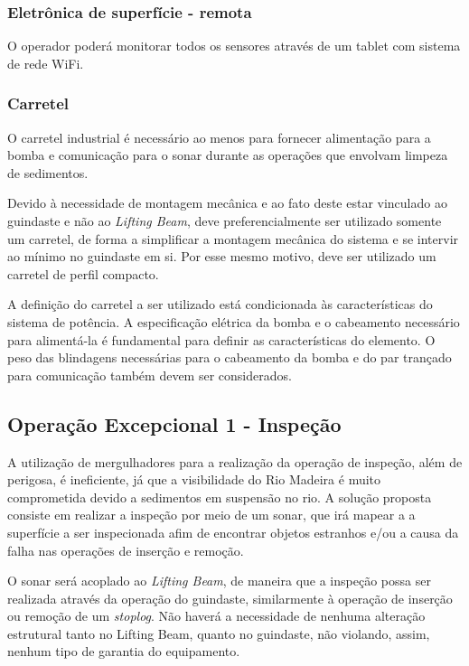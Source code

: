\subsubsection{Eletrônica de superfície - remota}
O operador poderá monitorar todos os sensores através de um tablet com sistema
de rede WiFi.

\subsubsection{Carretel}
O carretel industrial é necessário ao menos para fornecer alimentação para a
bomba e comunicação para o sonar durante as operações que envolvam limpeza de
sedimentos.
 
Devido à necessidade de montagem mecânica e ao fato deste estar vinculado ao
guindaste e não ao \textit{Lifting Beam}, deve preferencialmente ser utilizado
somente um carretel, de forma a simplificar a montagem mecânica do sistema e se
intervir ao mínimo no guindaste em si. Por esse mesmo motivo, deve ser utilizado
um carretel de perfil compacto.
 
A definição do carretel a ser utilizado está condicionada às características do
sistema de potência. A especificação elétrica da bomba e o cabeamento necessário
para alimentá-la é fundamental para definir as características do elemento. O
peso das blindagens necessárias para o cabeamento da bomba e do par trançado
para comunicação também devem ser considerados.

\subsection{Operação Excepcional 1 - Inspeção}
\label{sis:sol:1}
A utilização de mergulhadores para a realização da operação de inspeção, além de
perigosa, é ineficiente, já que a visibilidade do Rio Madeira é muito
comprometida devido a sedimentos em suspensão no rio. A solução proposta
consiste em realizar a inspeção por meio de um sonar, que irá mapear a a
superfície a ser inspecionada afim de encontrar objetos estranhos e/ou a causa
da falha nas operações de inserção e remoção.

O sonar será acoplado ao \emph{Lifting Beam}, de maneira que a inspeção possa
ser realizada através da operação do guindaste, similarmente à operação de
inserção ou remoção de um \emph{stoplog}. Não haverá a necessidade de nenhuma
alteração estrutural tanto no Lifting Beam, quanto no guindaste, não violando,
assim, nenhum tipo de garantia do equipamento.

